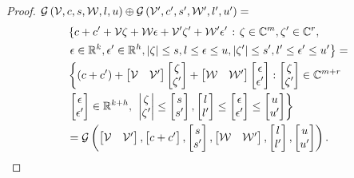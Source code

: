 \begin{proof}
$\mathcal{G}\left(\mathcal{V},c,s,\mathcal{W},l,u\right)\oplus\mathcal{G}\left(\mathcal{V}^\prime,c^\prime,
    s^\prime,\mathcal{W}^\prime,l^\prime,u^\prime\right)=$
%
\begin{align*}
&  \left\{c+c^\prime+\mathcal{V}\zeta+\mathcal{W}\epsilon+\mathcal{V}^\prime\zeta^\prime+\mathcal{W}^\prime\epsilon^\prime\right.:
  \left. \zeta\in\mathbb{C}^m,\zeta^\prime\in\mathbb{C}^r,\right.\\
  & \left. \epsilon\in\mathbb{R}^k,\epsilon^\prime\in\mathbb{R}^h,
    \left|\zeta\right|\leq s,l\leq\epsilon\leq
    u,\left|\zeta^\prime\right|\leq s^\prime,l^\prime\leq\epsilon^\prime\leq
    u^\prime\right\}=\\
& \left\{\left(c+c^\prime\right)+\left[\begin{matrix}\mathcal{V}
      &\mathcal{V}^\prime\end{matrix}\right]\left[\begin{matrix}\zeta\\\zeta^\prime\end{matrix}\right]+\left[\begin{matrix}\mathcal{W}
      &\mathcal{W}^\prime\end{matrix}\right]\left[\begin{matrix}\epsilon\\ \epsilon^\prime\end{matrix}\right]: \left[\begin{matrix}\zeta\\\zeta^\prime\end{matrix}\right]\in\mathbb{C}^{m+r}\right.\\
    & \left. \left[\begin{matrix}\epsilon\\\epsilon^\prime\end{matrix}\right]\in\mathbb{R}^{k+h},\right.
    \left.\left|\begin{matrix}\zeta\\\zeta^\prime\end{matrix}\right|\leq
        \left[\begin{matrix}s\\s^\prime\end{matrix}\right],
        \left[\begin{matrix}l\\l^\prime\end{matrix}\right]\leq\left[\begin{matrix}\epsilon\\\epsilon^\prime\end{matrix}\right]\leq\left[\begin{matrix}u\\u^\prime\end{matrix}\right]
        \right\}\\
& = \mathcal{G}\left(
    \left[\begin{matrix}\mathcal{V} & \mathcal{V}^\prime\end{matrix}\right]
  ,
            \left[\begin{matrix}c+c^\prime\end{matrix}\right]
          ,\left[\begin{matrix}s\\s^\prime\end{matrix}\right]
          ,\left[\begin{matrix}\mathcal{W} & \mathcal{W}^\prime\end{matrix}\right]
          ,\left[\begin{matrix}l\\ l^\prime\end{matrix}\right]
          ,\left[\begin{matrix}u\\ u^\prime\end{matrix}\right]
          \right).\hspace{1em}\qedhere
\end{align*}
%
\end{proof}
%

